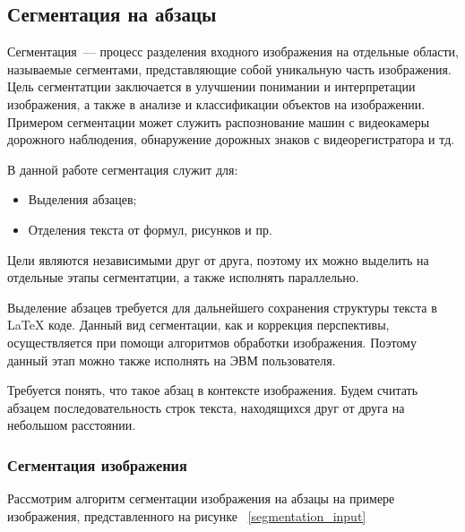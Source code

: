 \subsection{Сегментация на абзацы}

Сегментация~--- процесс разделения входного изображения на отдельные области, называемые сегментами, представляющие собой уникальную часть изображения. Цель сегментатции заключается в улучшении понимании и интерпретации изображения, а также в анализе и классификации объектов на изображении.
Примером сегментации может служить распознование машин с видеокамеры дорожного наблюдения, обнаружение дорожных знаков с видеорегистратора и тд.

В данной работе сегментация служит для:
\begin{itemize}
    \item Выделения абзацев;
    \item Отделения текста от формул, рисунков и пр.
\end{itemize}

Цели являются независимыми друг от друга, поэтому их можно выделить на отдельные этапы сегментатции, а также исполнять параллельно. 

Выделение абзацев требуется для дальнейшего сохранения структуры текста в \LaTeX\; коде. Данный вид сегментации, как и коррекция перспективы, осуществляется при помощи алгоритмов обработки изображения.
Поэтому данный этап можно также исполнять на ЭВМ пользователя.

Требуется понять, что такое абзац в контексте изображения. Будем считать абзацем последовательность строк текста, находящихся друг от друга на небольшом расстоянии.

\subsubsection{Сегментация изображения}

Рассмотрим алгоритм сегментации изображения на абзацы на примере изображения, представленного на рисунке ~\ref{segmentation_input}

